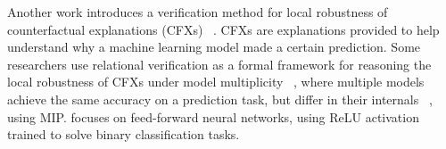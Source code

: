 Another work introduces a verification method for local robustness of counterfactual explanations (CFXs) ~\cite{CFXROBUSTNESS}.
 CFXs are explanations provided to help understand why a machine learning model made a certain prediction. Some researchers use relational verification as a formal framework for reasoning the local robustness of CFXs under model multiplicity  ~\cite{CFXROBUSTNESS}, where multiple models achieve the same accuracy on a prediction task, but differ in their internals ~\cite{PREDICTIVEMULTIPICITY}, using MIP. \cite{CFXROBUSTNESS} focuses on feed-forward neural networks, using ReLU activation trained to solve binary classification tasks.
